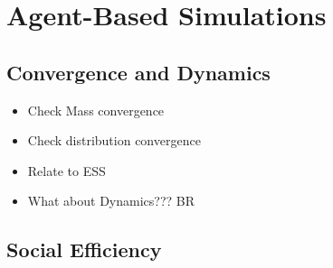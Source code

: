 \section{Agent-Based Simulations}
\label{sec: Chapter 4}  
\subsection{Convergence and Dynamics}
\begin{itemize}
    \item Check Mass convergence
    \item Check distribution convergence
    \item Relate to ESS
    \item What about Dynamics??? BR
\end{itemize} 
\subsection{Social Efficiency}


